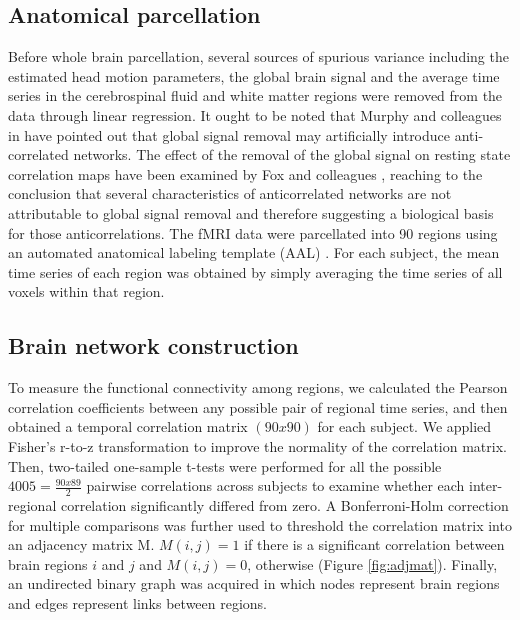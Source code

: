 \documentclass[12pt,a4paper]{article}
\begin{document}
\subsection{Anatomical parcellation} 
Before whole brain parcellation, several sources of spurious variance including
the estimated head motion parameters, the global brain signal and the average
time series in the cerebrospinal fluid and white matter regions were removed
from the data through linear regression. It ought to be noted that Murphy and colleagues in \cite{murphy_impact_2009}  
have pointed out that global signal removal may artificially introduce anti-correlated networks. 
The effect of the removal of the global signal on resting state correlation maps have been examined by Fox and colleagues \cite{fox_global_2009}, reaching to the conclusion that several characteristics of anticorrelated networks are not attributable to global signal removal and therefore suggesting a biological basis for those anticorrelations.  
The fMRI data were parcellated into 90 regions using an automated anatomical labeling template (AAL) \cite{tzourio-mazoyer_automated_2002}. For each subject, the mean time series of each region was obtained by simply
averaging the time series of all voxels within that region.

\subsection{Brain network construction} 
To measure the functional connectivity among regions, we calculated the Pearson
correlation coefficients between any possible pair of regional time series, and
then obtained a temporal correlation matrix $(90x90)$ for each subject. We
applied Fisher's r-to-z transformation to improve the normality of the
correlation matrix. Then, two-tailed one-sample t-tests were performed for all
the possible $4005=\frac{90x89}{2}$ pairwise correlations across subjects
to examine whether each inter-regional correlation significantly differed from
zero. 
A Bonferroni-Holm correction for multiple comparisons was
further used to threshold the correlation matrix into an adjacency matrix M. $M(i,j) =1$ if there is a significant correlation between brain regions $i$ and $j$ and $M(i,j) =0$, otherwise (Figure \ref{fig:adjmat}). Finally, an undirected binary graph was acquired in which nodes represent brain regions and edges represent links between regions.
\end{document}
